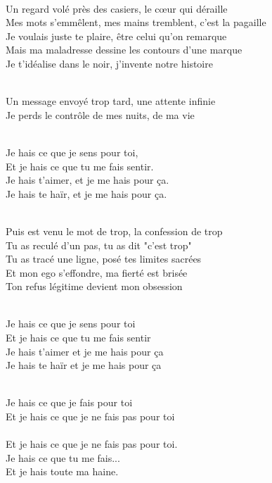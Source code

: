 \begin{lyrics}
\\

Un regard volé près des casiers, le cœur qui déraille\\
Mes mots s'emmêlent, mes mains tremblent, c'est la pagaille\\
Je voulais juste te plaire, être celui qu'on remarque\\
Mais ma maladresse dessine les contours d'une marque\\
Je t'idéalise dans le noir, j'invente notre histoire

\\
Un message envoyé trop tard, une attente infinie\\
Je perds le contrôle de mes nuits, de ma vie

\\
Je hais ce que je sens pour toi,\\
Et je hais ce que tu me fais sentir.\\
Je hais t'aimer, et je me hais pour ça.\\
Je hais te haïr, et je me hais pour ça.

\\
Puis est venu le mot de trop, la confession de trop\\
Tu as reculé d'un pas, tu as dit "c'est trop"\\
Tu as tracé une ligne, posé tes limites sacrées\\
Et mon ego s'effondre, ma fierté est brisée\\
Ton refus légitime devient mon obsession

\\
Je hais ce que je sens pour toi\\
Et je hais ce que tu me fais sentir\\
Je hais t'aimer et je me hais pour ça\\
Je hais te haïr et je me hais pour ça

\\
Je hais ce que je fais pour toi\\
Et je hais ce que je ne fais pas pour toi\\
\\
Et je hais ce que je ne fais pas pour toi.\\
Je hais ce que tu me fais...\\
Et je hais toute ma haine.


\end{lyrics}
